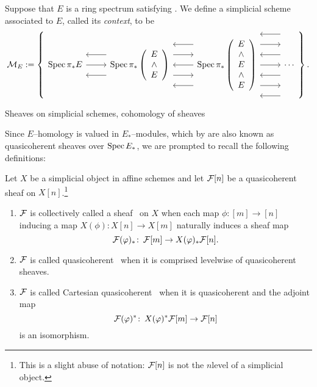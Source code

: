 \begin{definition}
Suppose that $E$ is a ring spectrum satisfying {\CH}.  We define a simplicial scheme associated to $E$, called its \textit{context}, to be \[\mathcal{M}_E := \left\{
\begin{tikzcd}
\Spec \pi_* E \arrow{r} \arrow[leftarrow,shift left=\baselineskip]{r} \arrow[leftarrow,shift right=\baselineskip]{r} & \Spec \pi_* \left( \begin{array}{c} E \\ \sm \\ E \end{array} \right) \arrow[leftarrow, shift left=(2*\baselineskip)]{r} \arrow[shift left=\baselineskip]{r} \arrow[leftarrow]{r} \arrow[shift right=\baselineskip]{r} \arrow[leftarrow, shift right=(2*\baselineskip)]{r} & \Spec \pi_* \left( \begin{array}{c} E \\ \sm \\ E \\ \sm \\ E \end{array} \right) \arrow[leftarrow, shift left=(3*\baselineskip)]{r} \arrow[shift left=(2*\baselineskip)]{r} \arrow[leftarrow, shift left=\baselineskip]{r} \arrow{r} \arrow[leftarrow, shift right=\baselineskip]{r} \arrow[shift right=(2*\baselineskip)]{r} \arrow[leftarrow, shift right=(3*\baselineskip)]{r} & \cdots
\end{tikzcd}
\right\}.\]
\end{definition}

Sheaves on simplicial schemes, cohomology of sheaves

Since $E$--homology is valued in $E_*$--modules, which by  are also known as quasicoherent sheaves over $\operatorname{Spec} E_*$, we are prompted to recall the following definitions:
\begin{definition}
Let $X$ be a simplicial object in affine schemes and let $\mathcal{F}[n]$ be a quasicoherent sheaf on $X[n]$.\footnote{This is a slight abuse of notation: $\mathcal{F}[n]$ is not the $n$\th level of a simplicial object.}
\begin{enumerate}
\item $\mathcal{F}$ is collectively called a sheaf~\cite[Tag 09VK]{stacks-project} on $X$ when each map $\phi: [m] \to [n]$ inducing a map $X(\phi): X[n] \to X[m]$ naturally induces a sheaf map \[\mathcal{F}(\varphi)_* \colon\thinspace \mathcal{F}[m] \to X(\varphi)_* \mathcal{F}[n].\]
\item $\mathcal{F}$ is called quasicoherent~\cite[Tag 07TF]{stacks-project} when it is comprised levelwise of quasicoherent sheaves.
\item $\mathcal{F}$ is called Cartesian quasicoherent~\cite[Tag 07TF]{stacks-project} when it is quasicoherent and the adjoint map \[\mathcal{F}(\varphi)^* \colon\thinspace X(\varphi)^* \mathcal{F}[m] \to \mathcal{F}[n]\] is an isomorphism.
\end{enumerate}
\end{definition}

